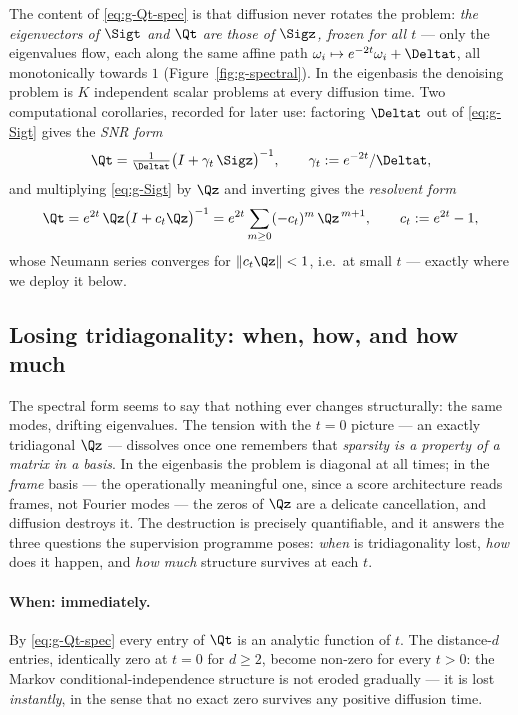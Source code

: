 The content of \eqref{eq:g-Qt-spec} is that diffusion never rotates the
problem: \emph{the eigenvectors of $\Sigt$ and $\Qt$ are those of $\Sigz$,
frozen for all $t$} --- only the eigenvalues flow, each along the same
affine path $\omega_i \mapsto e^{-2t}\omega_i + \Deltat$, all monotonically
towards $1$ (Figure~\ref{fig:g-spectral}). In the eigenbasis the denoising
problem is $K$ independent scalar problems at every diffusion time. Two
computational corollaries, recorded for later use: factoring $\Deltat$ out
of \eqref{eq:g-Sigt} gives the \emph{SNR form}
\begin{equation}
  \Qt = \tfrac{1}{\Deltat} \big( I + \gamma_t\, \Sigz \big)^{-1},
  \qquad \gamma_t := e^{-2t}/\Deltat ,
  \label{eq:g-Qt-snr}
\end{equation}
and multiplying \eqref{eq:g-Sigt} by $\Qz$ and inverting gives the
\emph{resolvent form}
\begin{equation}
  \Qt = e^{2t}\, \Qz \big( I + c_t \Qz \big)^{-1}
      = e^{2t} \sum_{m \geq 0} (-c_t)^m\, \Qz^{\,m+1},
  \qquad c_t := e^{2t} - 1 ,
  \label{eq:g-Qt-res}
\end{equation}
whose Neumann series converges for $\|c_t \Qz\| < 1$, i.e.\ at small $t$
--- exactly where we deploy it below.

\subsection{Losing tridiagonality: when, how, and how much}
\label{sec:g-tridiag-loss}

The spectral form seems to say that nothing ever changes structurally: the
same modes, drifting eigenvalues. The tension with the $t = 0$ picture ---
an exactly tridiagonal $\Qz$ --- dissolves once one remembers that
\emph{sparsity is a property of a matrix in a basis}. In the eigenbasis the
problem is diagonal at all times; in the \emph{frame} basis --- the
operationally meaningful one, since a score architecture reads frames, not
Fourier modes --- the zeros of $\Qz$ are a delicate cancellation, and
diffusion destroys it. The destruction is precisely quantifiable, and it
answers the three questions the supervision programme poses: \emph{when} is
tridiagonality lost, \emph{how} does it happen, and \emph{how much}
structure survives at each $t$.

\paragraph{When: immediately.} By \eqref{eq:g-Qt-spec} every entry of
$\Qt$ is an analytic function of $t$. The distance-$d$ entries, identically
zero at $t = 0$ for $d \geq 2$, become non-zero for every $t > 0$: the
Markov conditional-independence structure is not eroded gradually --- it is
lost \emph{instantly}, in the sense that no exact zero survives any positive
diffusion time.

